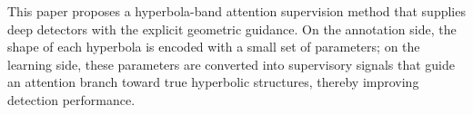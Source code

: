 \documentclass[lettersize,journal]{IEEEtran}
\begin{document}

This paper proposes a hyperbola-band attention supervision method that supplies deep detectors with the explicit geometric guidance. 
On the annotation side, the shape of each hyperbola is encoded with a small set of parameters; on the learning side, these parameters are converted into supervisory signals that guide an attention branch toward true hyperbolic structures, thereby improving detection performance.
\end{document}
